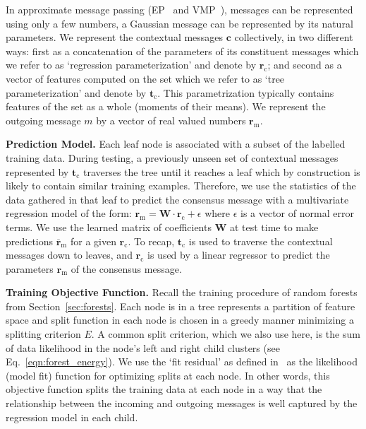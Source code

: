 In approximate message passing (\eg EP~\cite{Minka2001} and VMP~\cite{Winn2005}), messages can be represented using only a few numbers, \eg a Gaussian message can be represented by its natural parameters. We represent the contextual messages $\mathbf{c}$ collectively, in two different ways: first as a concatenation of the parameters of its constituent messages which we refer to as `regression parameterization' and denote by $\mathbf{r}_\textrm{c}$; and second as a vector of features computed on the set which we refer to as `tree parameterization' and denote by $\mathbf{t}_\textrm{c}$. This parametrization typically contains features of the set as a whole (\eg moments of their means). We represent the outgoing message $m$ by a vector of real valued numbers $\mathbf{r}_\textrm{m}$.

\textbf{Prediction Model.} Each leaf node is associated with a subset of the labelled training data. During testing, a previously unseen set of contextual messages represented by $\mathbf{t}_\textrm{c}$ traverses the tree until it reaches a leaf which by construction is likely to contain similar training examples. Therefore, we use the statistics of the data gathered in that leaf to predict the consensus message with a multivariate regression model of the form: $\mathbf{r}_\textrm{m} = \mathbf{W} \cdot \mathbf{r}_\textrm{c} + \epsilon$ where $\epsilon$ is a vector of normal error terms. We use the learned matrix of coefficients $\mathbf{W}$ at test time to make predictions $\overline{\mathbf{r}}_\textrm{m}$ for a given $\mathbf{r}_\textrm{c}$. To recap, $\mathbf{t}_\textrm{c}$ is used to traverse the contextual messages down to leaves, and $\mathbf{r}_\textrm{c}$ is used by a linear regressor to predict the parameters $\mathbf{r}_\textrm{m}$ of the consensus message.

\textbf{Training Objective Function.} Recall the training procedure of random forests from Section~\ref{sec:forests}. Each node is in a tree represents a partition of feature space and
split function in each node is chosen in a greedy manner minimizing a splitting criterion $E$.
A common split criterion, which we also use here, is the sum of data likelihood in the node's
left and right child clusters (see Eq.~\ref{eqn:forest_energy}). We use the `fit residual' as
defined in~\citep{Eslami2014} as the likelihood (model fit) function for optimizing splits at
each node. In other words, this objective function splits the training data at each node in a way that the relationship between the incoming and outgoing messages is well captured by the regression model in each child.

